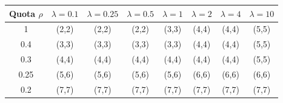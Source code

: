 \begin{tabular}{@{}cccccccc@{}}
\toprule
Quota $\rho$ & $\lambda=0.1$ & $\lambda=0.25$ & $\lambda=0.5$ & $\lambda=1$ & $\lambda=2$ & $\lambda=4$ & $\lambda=10$\\
\midrule
1 & (2,2) & (2,2) & (2,2) & (3,3) & (4,4) & (4,4) & (5,5)\\
0.4 & (3,3) & (3,3) & (3,3) & (3,3) & (4,4) & (4,4) & (5,5)\\
0.3 & (4,4) & (4,4) & (4,4) & (4,4) & (4,4) & (4,4) & (5,5)\\
0.25 & (5,6) & (5,6) & (5,6) & (5,6) & (6,6) & (6,6) & (6,6)\\
0.2 & (7,7) & (7,7) & (7,7) & (7,7) & (7,7) & (7,7) & (7,7)\\
\bottomrule
\end{tabular}
